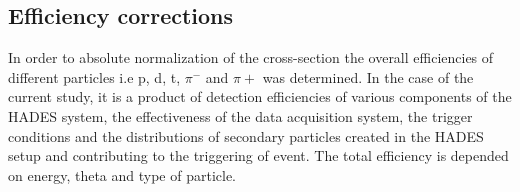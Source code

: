 \subsection{\label{Eff_corr} Efficiency corrections}
In order to absolute normalization of the cross-section the overall efficiencies of different particles i.e p, d, t, $\pi^-$ and $\pi+$ was determined. In the case of the current study, it is a product of detection efficiencies of various components of the HADES system, the effectiveness of the data acquisition system, the trigger conditions and the distributions of secondary particles created in the HADES setup and contributing to the triggering of event. The total efficiency is depended on energy, theta and type of particle.





